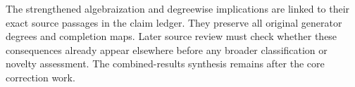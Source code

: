 The strengthened algebraization and degreewise implications are linked to their exact source passages in the claim ledger. They preserve all original generator degrees and completion maps. Later source review must check whether these consequences already appear elsewhere before any broader classification or novelty assessment. The combined-results synthesis remains after the core correction work.
